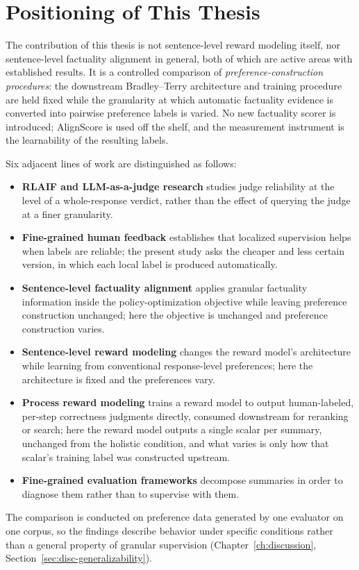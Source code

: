 \section{Positioning of This Thesis}
\label{sec:rw-positioning}

The contribution of this thesis is not sentence-level reward modeling itself, nor
sentence-level factuality alignment in general, both of which are active areas
with established results. It is a controlled comparison of
\emph{preference-construction procedures}: the downstream Bradley--Terry
architecture and training procedure are held fixed while the granularity at which
automatic factuality evidence is converted into pairwise preference labels is
varied. No new factuality scorer is introduced; AlignScore is used off the shelf,
and the measurement instrument is the learnability of the resulting labels.

Six adjacent lines of work are distinguished as follows:

\begin{itemize}
  \item \textbf{RLAIF and LLM-as-a-judge research}
    \citep{bai2022constitutional, lee2023rlaif, zheng2023judging, gu2024survey}
    studies judge reliability at the level of a whole-response verdict, rather
    than the effect of querying the judge at a finer granularity.
  \item \textbf{Fine-grained human feedback} \citep{wu2023finegrained}
    establishes that localized supervision helps when labels are reliable; the
    present study asks the cheaper and less certain version, in which each local
    label is produced automatically.
  \item \textbf{Sentence-level factuality alignment} \citep{gu2025maskdpo}
    applies granular factuality information inside the policy-optimization
    objective while leaving preference construction unchanged; here the objective
    is unchanged and preference construction varies.
  \item \textbf{Sentence-level reward modeling} \citep{qiu2025sentencelevel}
    changes the reward model's architecture while learning from conventional
    response-level preferences; here the architecture is fixed and the
    preferences vary.
  \item \textbf{Process reward modeling} \citep{lightman2023verify} trains a
    reward model to output human-labeled, per-step correctness judgments
    directly, consumed downstream for reranking or search; here the reward
    model outputs a single scalar per summary, unchanged from the holistic
    condition, and what varies is only how that scalar's training label was
    constructed upstream.
  \item \textbf{Fine-grained evaluation frameworks}
    \citep{laban2022summac, song2024finesure, min2023factscore} decompose
    summaries in order to diagnose them rather than to supervise with them.
\end{itemize}

The comparison is conducted on preference data generated by one evaluator on one
corpus, so the findings describe behavior under specific conditions rather than a
general property of granular supervision
(Chapter~\ref{ch:discussion}, Section~\ref{sec:disc-generalizability}).
